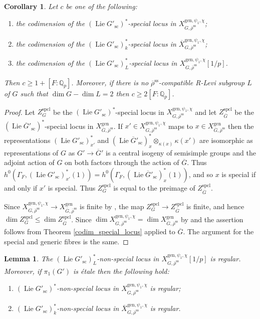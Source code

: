 \documentclass{amsart}
\newtheorem{lem}[prop]{Lemma}
\newtheorem{cor}[prop]{Corollary}
\theoremstyle{definition}
\theoremstyle{remark}
\newcommand{\Qp}{\mathbb {Q}_p}
\newcommand{\rhobar}{\overline{\rho}}
\newcommand{\gen}{\mathrm{gen}}
\newcommand{\Xbar}{\overline{X}}
\DeclareMathOperator{\spcl}{spcl}
\DeclareMathOperator{\Lie}{Lie}
\newcommand{\rhobarss}{\rhobar^{\mathrm{ss}}}
\newcommand{\Gbar}{\overline{G}}
\newcommand{\sic}{\operatorname{sc}}
\begin{document}
\begin{cor}\label{special_codim_psi} Let $c$ be one of the following:
\begin{enumerate}
\item the codimension of the $(\Lie G'_{\sic})^*$-special locus  in $X^{\gen,\psi_1,\chi}_{G, \rhobarss}$;
\item the codimension of the $(\Lie G'_{\sic})^*_k$-special locus  in $\Xbar^{\gen,\psi_1,\chi}_{G, \rhobarss}$;
\item the codimension of the $(\Lie G'_{\sic})^*_L$-special locus  in $X^{\gen,\psi_1,\chi}_{G, \rhobarss}[1/p]$.
\end{enumerate}
Then $c\ge 1+[F:\Qp]$. 
Moreover, if there is no $\rhobarss$-compatible R-Levi subgroup $L$ of $G$ such that $\dim G -\dim L=2$ 
then $c\ge 2[F:\Qp]$.
\end{cor}
\begin{proof} Let $Z^{\spcl}_G$ be the $(\Lie G'_{\sic})^*$-special locus 
in $X^{\gen, \psi_1,\chi}_{G, \rhobarss}$ and let $Z^{\spcl}_{\Gbar}$ be 
the $(\Lie \Gbar'_{\sic})^*$-special 
locus in $X^{\gen}_{\Gbar, \rhobarss}$. 
If $x'\in X^{\gen, \psi_1,\chi}_{G, \rhobarss}$ maps to $x\in X^{\gen}_{\Gbar, \rhobarss}$ then 
the representations $(\Lie G'_{\sic})^*_{x'}$ and $(\Lie \Gbar'_{\sic})^*_{x}\otimes_{\kappa(x)} \kappa(x')$ 
are isomorphic as representations of $G$ as $G'\rightarrow \Gbar'$ is a central isogeny of semisimple groups and the adjoint action of $G$ on both factors through the action of $\Gbar$.
Thus $h^0(\Gamma_F, (\Lie G'_{\sic})^*_{x'}(1))= h^0(\Gamma_F, (\Lie \Gbar'_{\sic})^*_{x}(1))$, and so 
$x$ is special if and only if $x'$ is special. Thus $Z^{\spcl}_G$   is equal to 
the preimage  of $Z^{\spcl}_{\Gbar}$. 

Since $X^{\gen, \psi_1,\chi}_{G, \rhobarss} \rightarrow X^{\gen}_{\Gbar, \rhobarss}$ 
is finite by , the map $Z^{\spcl}_G\rightarrow Z^{\spcl}_{\Gbar}$ is finite, 
and hence $\dim Z^{\spcl}_G \le \dim Z^{\spcl}_{\Gbar}$. Since $\dim X^{\gen, \psi_1,\chi}_{G, \rhobarss}=\dim X^{\gen}_{\Gbar, \rhobarss}$
by   and  the 
assertion follows from Theorem \ref{codim_special_locus} applied to $\Gbar$. The argument for the special and generic fibres is the same. 
\end{proof}

\begin{lem}\label{non-spec_reg} The $(\Lie G'_{\sic})^*_L$-non-special locus in 
$X^{\gen,\psi_1,\chi}_{G, \rhobarss}[1/p]$ is regular. Moreover, if $\pi_1(G')$ is \'etale then 
the following hold:
\begin{enumerate}
\item $(\Lie G'_{\sic})^*$-non-special locus in $X^{\gen,\psi_1, \chi}_{G, \rhobarss}$ is regular;
\item $(\Lie G'_{\sic})^*_k$-non-special locus in $\Xbar^{\gen,\psi_1, \chi}_{G, \rhobarss}$ is regular.
\end{enumerate}
\end{lem} 
\end{document}
